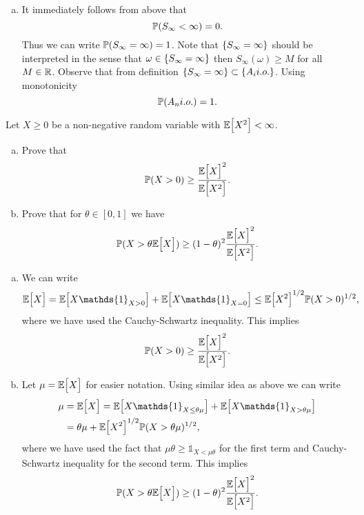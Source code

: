 \begin{solution}
\begin{enumerate}[(a)]
		\item It immediately follows from above that
		\[ \mathbb{P}(S_\infty  < \infty) = 0. \]
		Thus we can write $ \mathbb{P}(S_\infty = \infty) = 1 $. Note that $ \{S_\infty = \infty\} $ should be interpreted in the sense that $ \omega \in \{S_\infty = \infty\} $ then $ S_\infty(\omega) \geq M$ for all $ M\in \mathbb{R} $. Observe that from definition $ \{S_\infty = \infty\} \subset \{A_i i.o.\} $. Using monotonicity
		\[ \mathbb{P}(A_n i.o.) = 1. \]
	\end{enumerate}
\end{solution}

\begin{problem}
	Let $ X\geq 0 $ be a non-negative random variable with $ \mathbb{E}\big[X^2\big]< \infty $. 
	\begin{enumerate}[(a)]
		\item Prove that 
		\[ \mathbb{P}(X > 0) \geq \frac{\mathbb{E}\big[X\big]^2}{\mathbb{E}\big[X^2\big]}. \]
		\item Prove that for $ \theta \in [0,1] $ we have
		\[ \mathbb{P}(X > \theta \mathbb{E}\big[X\big]) \geq (1-\theta)^2 \frac{\mathbb{E}\big[X\big]^2}{\mathbb{E}\big[X^2\big]}. \]
	\end{enumerate}
\end{problem}
\begin{solution}
	\begin{enumerate}[(a)]
		\item We can write
		\[ \E{X} = \E{X\mathds{1}_{X>0}} + \E{X\mathds{1}_{X=0}} \leq \E{X^2}^{1/2}\prob(X>0)^{1/2}, \]
		where we have used the Cauchy-Schwartz inequality. This implies
		\[ \mathbb{P}(X>0) \geq \frac{\mathbb{E}\big[X\big]^2}{\mathbb{E}\big[X^2\big]}. \]
		
		\item Let $ \mu = \mathbb{E}\big[X\big] $ for easier notation. Using similar idea as above we can write
		\begin{align}
			\mu &= \E{X} = \E{X\mathds{1}_{X\leq \theta\mu}} + \E{X\mathds{1}_{X>\theta\mu}}\\
			&=\theta\mu + \E{X^2}^{1/2}\prob(X>\theta\mu) ^{1/2},
		\end{align}
		where we have used the fact that $ \mu\theta \geq \mathds{1}_{X<\mu\theta} $ for the first term and Cauchy-Schwartz inequality for the second term. This implies
		\[ \mathbb{P}(X > \theta \mathbb{E}\big[X\big]) \geq (1-\theta)^2 \frac{\mathbb{E}\big[X\big]^2}{\mathbb{E}\big[X^2\big]}. \]
	\end{enumerate}
\end{solution}

